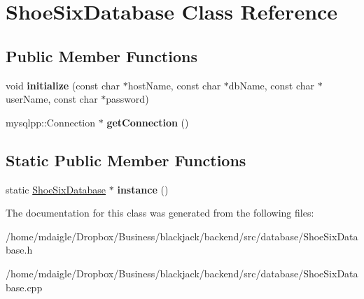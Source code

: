 \hypertarget{classShoeSixDatabase}{
\section{\-Shoe\-Six\-Database \-Class \-Reference}
\label{classShoeSixDatabase}
}
\subsection*{\-Public \-Member \-Functions}
\begin{DoxyCompactItemize}
\item 
\hypertarget{classShoeSixDatabase_abd277c957c83234d7cc6d479b9e46c95}{
void {\bfseries initialize} (const char $\ast$host\-Name, const char $\ast$db\-Name, const char $\ast$user\-Name, const char $\ast$password)}
\label{classShoeSixDatabase_abd277c957c83234d7cc6d479b9e46c95}

\item 
\hypertarget{classShoeSixDatabase_a06f7eabaf0c9caadcc381d61290da099}{
mysqlpp\-::\-Connection $\ast$ {\bfseries get\-Connection} ()}
\label{classShoeSixDatabase_a06f7eabaf0c9caadcc381d61290da099}

\end{DoxyCompactItemize}
\subsection*{\-Static \-Public \-Member \-Functions}
\begin{DoxyCompactItemize}
\item 
\hypertarget{classShoeSixDatabase_afbbf1cebd905571bd563a683764e2bf3}{
static \hyperlink{classShoeSixDatabase}{\-Shoe\-Six\-Database} $\ast$ {\bfseries instance} ()}
\label{classShoeSixDatabase_afbbf1cebd905571bd563a683764e2bf3}

\end{DoxyCompactItemize}


\-The documentation for this class was generated from the following files\-:\begin{DoxyCompactItemize}
\item 
/home/mdaigle/\-Dropbox/\-Business/blackjack/backend/src/database/\-Shoe\-Six\-Database.\-h\item 
/home/mdaigle/\-Dropbox/\-Business/blackjack/backend/src/database/\-Shoe\-Six\-Database.\-cpp\end{DoxyCompactItemize}

